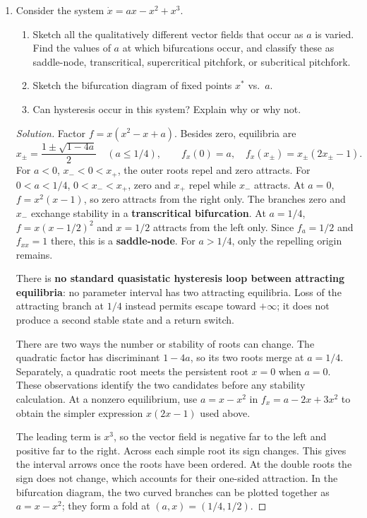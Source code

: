 \documentclass[10pt]{amsart}
\newenvironment{solution}
{\begin{proof}[Solution]}
{\end{proof}}
\begin{document}
\begin{enumerate}[label=\arabic*), leftmargin=*, itemsep=1em]
    \item Consider the system $\dot{x}=ax-x^2+x^3$.
    \begin{enumerate}[label=(\alph*)]
        \item Sketch all the qualitatively different vector fields that occur as $a$ is varied. Find the values of $a$ at which bifurcations occur, and classify these as saddle-node, transcritical, supercritical pitchfork, or subcritical pitchfork.
        \item Sketch the bifurcation diagram of fixed points $x^*$ vs.\ $a$.
        \item Can hysteresis occur in this system? Explain why or why not.
    \end{enumerate}

    \begin{solution}

Factor $f=x(x^2-x+a)$. Besides zero, equilibria are
\[
x_\pm=\frac{1\pm\sqrt{1-4a}}2\quad(a\le1/4),\qquad f_x(0)=a,\quad f_x(x_\pm)=x_\pm(2x_\pm-1).
\]
For $a<0$, $x_-<0<x_+$, the outer roots repel and zero attracts. For $0<a<1/4$, $0<x_-<x_+$, zero and $x_+$ repel while $x_-$ attracts. At $a=0$, $f=x^2(x-1)$, so zero attracts from the right only. The branches zero and $x_-$ exchange stability in a \textbf{transcritical bifurcation}. At $a=1/4$, $f=x(x-1/2)^2$ and $x=1/2$ attracts from the left only. Since $f_a=1/2$ and $f_{xx}=1$ there, this is a \textbf{saddle-node}. For $a>1/4$, only the repelling origin remains.

There is \textbf{no standard quasistatic hysteresis loop between attracting equilibria}: no parameter interval has two attracting equilibria. Loss of the attracting branch at $1/4$ instead permits escape toward $+\infty$; it does not produce a second stable state and a return switch.

There are two ways the number or stability of roots can change. The quadratic factor has discriminant $1-4a$, so its two roots merge at $a=1/4$. Separately, a quadratic root meets the persistent root $x=0$ when $a=0$. These observations identify the two candidates before any stability calculation. At a nonzero equilibrium, use $a=x-x^2$ in $f_x=a-2x+3x^2$ to obtain the simpler expression $x(2x-1)$ used above.

The leading term is $x^3$, so the vector field is negative far to the left and positive far to the right. Across each simple root its sign changes. This gives the interval arrows once the roots have been ordered. At the double roots the sign does not change, which accounts for their one-sided attraction. In the bifurcation diagram, the two curved branches can be plotted together as $a=x-x^2$; they form a fold at $(a,x)=(1/4,1/2)$.


\end{solution}
\end{enumerate}
\end{document}
